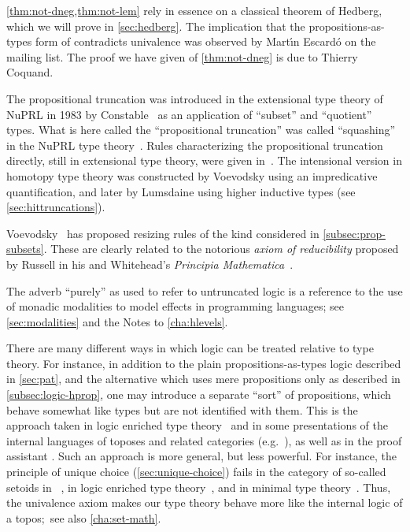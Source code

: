 \autoref{thm:not-dneg,thm:not-lem} rely in essence on a classical theorem of Hedberg,
%
%
which we will prove in \autoref{sec:hedberg}.
The implication that the propositions-as-types form of \LEM{} contradicts univalence was observed by Mart\'\i n Escard\'o on the \Agda mailing list.
The proof we have given of \autoref{thm:not-dneg} is due to Thierry Coquand.

The propositional truncation was introduced in the extensional type theory of
%
NuPRL in 1983 by Constable~\cite{Con85} as an
application of ``subset'' and ``quotient'' types.  What is here called the
``propositional truncation'' was called ``squashing'' in the NuPRL type theory~\cite{constable+86nuprl-book}.
Rules characterizing the propositional truncation directly, still in extensional type theory, were given in~\cite{ab:bracket-types}.
The intensional version in homotopy type theory was constructed by Voevodsky using an impredicative quantification, and later by Lumsdaine using higher inductive types (see \autoref{sec:hittruncations}).

%
Voevodsky~\cite{Universe-poly} has proposed resizing rules of the kind considered in \autoref{subsec:prop-subsets}.
%
These are clearly related to the notorious \emph{axiom of reducibility} proposed by Russell in his and Whitehead's \emph{Principia Mathematica}~\cite{WR:PM}.

The adverb ``purely'' as used to refer to untruncated logic is a reference to the use of monadic modalities to model effects in programming languages; see \autoref{sec:modalities} and the Notes to \autoref{cha:hlevels}.

There are many different ways in which logic can be treated relative to type theory.
For instance, in addition to the plain propositions-as-types logic described in \autoref{sec:pat}, and the alternative which uses mere propositions only as described in \autoref{subsec:logic-hprop}, one may introduce a separate ``sort'' of propositions, which behave somewhat like types but are not identified with them.
This is the approach taken in logic enriched type theory~\cite{aczel2002collection} and in some presentations of the internal languages of toposes and related categories (e.g.~\cite{jacobs1999categorical,elephant}), as well as in the proof assistant \Coq.
Such an approach is more general, but less powerful.
For instance, the principle of unique choice (\autoref{sec:unique-choice}) fails in the category of so-called setoids in \Coq~\cite{Spiwack}, in logic enriched type theory~\cite{aczel2002collection}, and in minimal type theory~\cite{maietti2005toward}.
Thus, the univalence axiom makes our type theory behave more like the internal logic of a topos;~see also \autoref{cha:set-math}.


